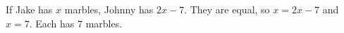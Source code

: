 If Jake has $x$ marbles, Johnny has $2x-7$. They are equal, so $x=2x-7$ and $x=7$. Each has $\boxed{7}$ marbles.
